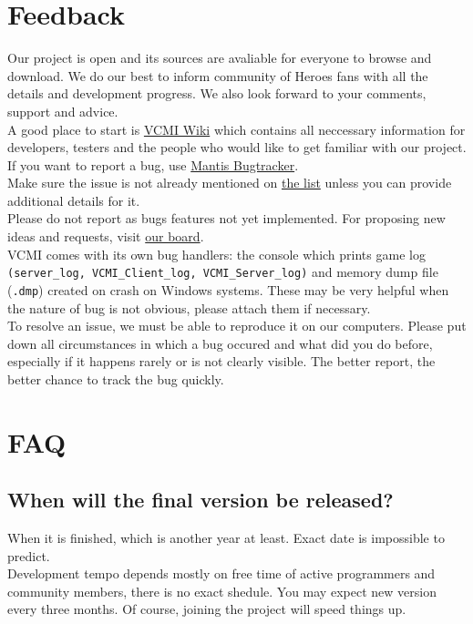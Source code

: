\documentclass[a4size,final]{article}
\begin{document}
\section{Feedback}
Our project is open and its sources are avaliable for everyone to browse and download. We do our best to inform community of Heroes fans with all the details and development progress. We also look forward to your comments, support and advice.\medskip\\
A good place to start is \href{http://wiki.vcmi.eu/index.php?title=Main_Page}{VCMI Wiki} which contains all neccessary information for developers, testers and the people who would like to get familiar with our project.
If you want to report a bug, use \href{http://bugs.vcmi.eu/bug_report_advanced_page.php}{Mantis Bugtracker}.\\
Make sure the issue is not already mentioned on \href{http://bugs.vcmi.eu/view_all_bug_page.php}{the list} unless you can provide additional details for it.\\
Please do not report as bugs features not yet implemented. For proposing new ideas and requests, visit \href{http://forum.vcmi.eu/index.php}{our board}.\medskip\\
VCMI comes with its own bug handlers: the console which prints game log \texttt{(server\_log, VCMI\_Client\_log, VCMI\_Server\_log)} and memory dump file (\texttt{.dmp}) created on crash on Windows systems. These may be very helpful when the nature of bug is not obvious, please attach them if necessary.\medskip\\
To resolve an issue, we must be able to reproduce it on our computers. Please put down all circumstances in which a bug occured and what did you do before, especially if it happens rarely or is not clearly visible. The better report, the better chance to track the bug quickly.
\section{FAQ}
\subsection{When will the final version be released?}
When it is finished, which is another year at least. Exact date is impossible to predict.\\
Development tempo depends mostly on free time of active programmers and community members, there is no exact shedule. You may expect new version every three months. Of course, joining the project will speed things up.
\end{document}
